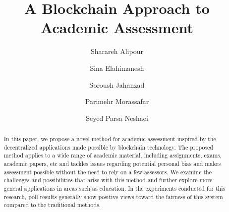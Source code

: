 \documentclass[manuscript,review,anonymous]{acmart}%
\begin{document}
\title{A Blockchain Approach to Academic Assessment}


\author{Sharareh Alipour}
\authornotemark[1]

\author{Sina Elahimanesh}

\author{Soroush Jahanzad}

\author{Parimehr Morassafar}

\author{Seyed Parsa Neshaei}



\renewcommand{\shortauthors}{Alipour and et al.}

\begin{abstract}
  In this paper, we propose a novel method for academic assessment inspired by the decentralized applications made possible by blockchain technology.
  The proposed method applies to a wide range of academic material, including assignments, exams, academic papers, etc 
  and tackles issues regarding potential personal bias and makes assessment possible without the need to rely on a few assessors.
  We examine the challenges and possibilities that arise with this method and further explore more general applications in areas such as education.
  In the experiments conducted for this research, poll results generally show positive views toward the fairness of this system compared to the traditional methods.
  
\end{abstract}
\end{document}
